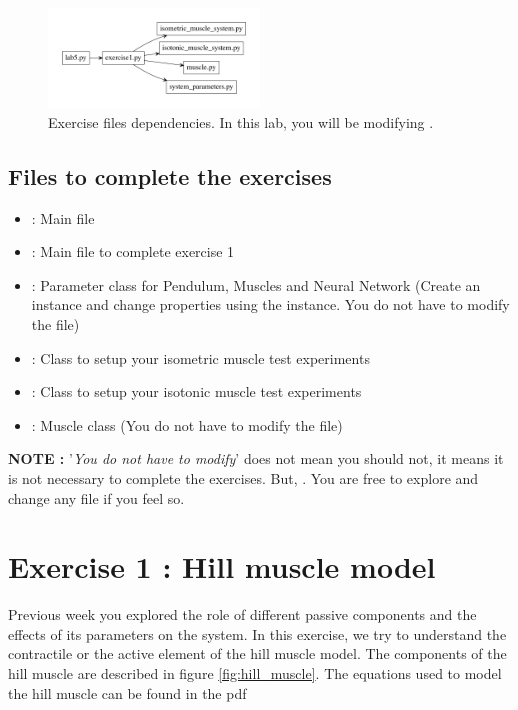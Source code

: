 \documentclass{cmc}
\begin{document}
\begin{figure}[ht]
  \centering \includegraphics[width=0.5\textwidth]{figures/files_lab5}
  \caption{\label{fig:files_lab5} Exercise files dependencies. In this
  lab, you will be modifying .}
\end{figure}

\subsection*{Files to complete the exercises}
\label{sec:intro_lab5}

\begin{itemize}
\item {} : Main file
\item {} : Main file to complete exercise 1
\item {} : Parameter class for Pendulum,
  Muscles and Neural Network (Create an instance and change properties
  using the instance. You do not have to modify the file)
\item {} : Class to setup your
  isometric muscle test experiments
\item {} : Class to setup your
  isotonic muscle test experiments
\item {} : Muscle class (You do not have to modify
  the file)
\end{itemize}

\textbf{NOTE : } '\textit{You do not have to modify}' does not mean
you should not, it means it is not necessary to complete the
exercises. But, . You are free to explore
and change any file if you feel so.

\newpage
\section*{Exercise 1 : Hill muscle model}
\label{sec:question-2}

Previous week you explored the role of different passive components
and the effects of its parameters on the system. In this exercise, we
try to understand the contractile or the active element of the hill
muscle model. The components of the hill muscle are described in
figure \ref{fig:hill_muscle}. The equations used to model the hill
muscle can be found in the pdf 
\end{document}
